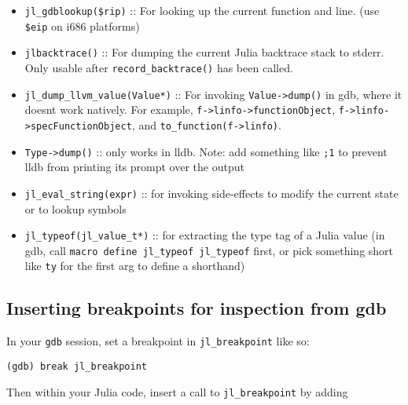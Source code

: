 \begin{itemize}
\item \texttt{jl\_gdblookup(\$rip)} :: For looking up the current function and line. (use \texttt{\$eip} on i686 platforms)


\item \texttt{jlbacktrace()} :: For dumping the current Julia backtrace stack to stderr. Only usable after \texttt{record\_backtrace()} has been called.


\item \texttt{jl\_dump\_llvm\_value(Value*)} :: For invoking \texttt{Value->dump()} in gdb, where it doesn{\textquotesingle}t work natively. For example, \texttt{f->linfo->functionObject}, \texttt{f->linfo->specFunctionObject}, and \texttt{to\_function(f->linfo)}.


\item \texttt{Type->dump()} :: only works in lldb. Note: add something like \texttt{;1} to prevent lldb from printing its prompt over the output


\item \texttt{jl\_eval\_string({\textquotedbl}expr{\textquotedbl})} :: for invoking side-effects to modify the current state or to lookup symbols


\item \texttt{jl\_typeof(jl\_value\_t*)} :: for extracting the type tag of a Julia value (in gdb, call \texttt{macro define jl\_typeof jl\_typeof} first, or pick something short like \texttt{ty} for the first arg to define a shorthand)

\end{itemize}


\hypertarget{1392415358123037898}{}


\subsection{Inserting breakpoints for inspection from gdb}



In your \texttt{gdb} session, set a breakpoint in \texttt{jl\_breakpoint} like so:




\begin{lstlisting}
(gdb) break jl_breakpoint
\end{lstlisting}



Then within your Julia code, insert a call to \texttt{jl\_breakpoint} by adding




